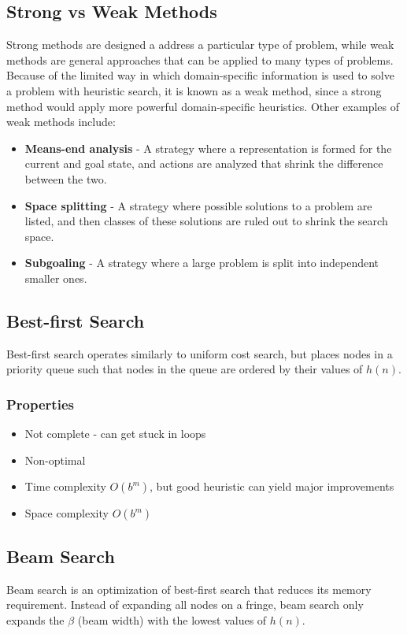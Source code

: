 \documentclass[12pt,titlepage]{article}
\begin{document}
    \subsection{Strong vs Weak Methods}
      Strong methods are designed a address a particular type of problem, while weak methods are general approaches that can be applied
      to many types of problems. Because of the limited way in which domain-specific information is used to solve a problem with heuristic
      search, it is known as a weak method, since a strong method would apply more powerful domain-specific heuristics. Other examples of
      weak methods include:
      \begin{itemize}
        \item \textbf{Means-end analysis} - A strategy where a representation is formed for the current and goal state, and actions are
        analyzed that shrink the difference between the two.
        \item \textbf{Space splitting} - A strategy where possible solutions to a problem are listed, and then classes of these solutions
        are ruled out to shrink the search space.
        \item \textbf{Subgoaling} - A strategy where a large problem is split into independent smaller ones.
      \end{itemize}

    \subsection{Best-first Search}
      Best-first search operates similarly to uniform cost search, but places nodes in a priority queue such that nodes in the queue are
      ordered by their values of $h(n)$.

      \subsubsection{Properties}
        \begin{itemize}
          \item Not complete - can get stuck in loops
          \item Non-optimal
          \item Time complexity $O(b^m)$, but good heuristic can yield major improvements
          \item Space complexity $O(b^m)$
        \end{itemize}

    \subsection{Beam Search}
      Beam search is an optimization of best-first search that reduces its memory requirement. Instead of expanding all nodes on a fringe,
      beam search only expands the $\beta$ (beam width) with the lowest values of $h(n)$.
\end{document}
